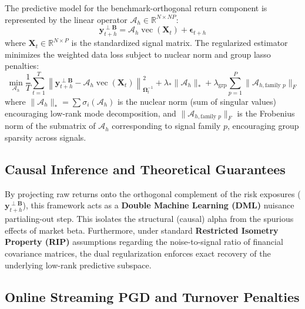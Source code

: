\documentclass[12pt]{article}
\begin{document}
The predictive model for the benchmark-orthogonal return component is represented by the linear operator $\mathcal{A}_{h} \in \mathbb{R}^{N \times NP}$:
\begin{equation}
    \mathbf{y}_{t+h}^{\perp \mathbf{B}} = \mathcal{A}_{h} \operatorname{vec}(\mathbf{X}_t) + \mathbf{\epsilon}_{t+h}
\end{equation}
where $\mathbf{X}_t \in \mathbb{R}^{N \times P}$ is the standardized signal matrix. The regularized estimator minimizes the weighted data loss subject to nuclear norm and group lasso penalties:
\begin{equation}
    \min_{\mathcal{A}_h} \frac{1}{T} \sum_{t=1}^T \left\| \mathbf{y}_{t+h}^{\perp \mathbf{B}} - \mathcal{A}_h \operatorname{vec}(\mathbf{X}_t) \right\|_{\mathbf{\Omega}_t^{-1}}^2 + \lambda_* \|\mathcal{A}_h\|_* + \lambda_{\text{grp}} \sum_{p=1}^P \|\mathcal{A}_{h,\text{family } p}\|_F
\end{equation}
where $\|\mathcal{A}_h\|_* = \sum \sigma_i(\mathcal{A}_h)$ is the nuclear norm (sum of singular values) encouraging low-rank mode decomposition, and $\|\mathcal{A}_{h,\text{family } p}\|_F$ is the Frobenius norm of the submatrix of $\mathcal{A}_h$ corresponding to signal family $p$, encouraging group sparsity across signals.

\subsection{Causal Inference and Theoretical Guarantees}

By projecting raw returns onto the orthogonal complement of the risk exposures ($\mathbf{y}_{t+h}^{\perp \mathbf{B}}$), this framework acts as a \textbf{Double Machine Learning (DML)} nuisance partialing-out step. This isolates the structural (causal) alpha from the spurious effects of market beta. Furthermore, under standard \textbf{Restricted Isometry Property (RIP)} assumptions regarding the noise-to-signal ratio of financial covariance matrices, the dual regularization enforces exact recovery of the underlying low-rank predictive subspace.

\subsection{Online Streaming PGD and Turnover Penalties}
\end{document}
